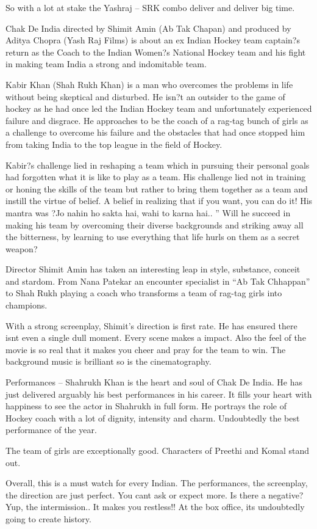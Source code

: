 \documentclass[11pt]{article}
\begin{document}
So with a lot at stake the Yashraj – SRK combo deliver and deliver big time.

Chak De India directed by Shimit Amin (Ab Tak Chapan) and produced by Aditya Chopra (Yash Raj Films) is about an ex Indian Hockey team captain?s return as the Coach to the Indian Women?s National Hockey team and his fight in making team India a strong and indomitable team.

Kabir Khan (Shah Rukh Khan) is a man who overcomes the problems in life without being skeptical and disturbed. He isn?t an outsider to the game of hockey as he had once led the Indian Hockey team and unfortunately experienced failure and disgrace. He approaches to be the coach of a rag-tag bunch of girls as a challenge to overcome his failure and the obstacles that had once stopped him from taking India to the top league in the field of Hockey.



Kabir?s challenge lied in reshaping a team which in pursuing their personal goals had forgotten what it is like to play as a team. His challenge lied not in training or honing the skills of the team but rather to bring them together as a team and instill the virtue of belief. A belief in realizing that if you want, you can do it! His mantra was ?Jo nahin ho sakta hai, wahi to karna hai.. ” Will he succeed in making his team by overcoming their diverse backgrounds and striking away all the bitterness, by learning to use everything that life hurls on them as a secret weapon?

Director Shimit Amin has taken an interesting leap in style, substance, conceit and stardom. From Nana Patekar an encounter specialist in “Ab Tak Chhappan” to Shah Rukh playing a coach who transforms a team of rag-tag girls into champions.

With a strong screenplay, Shimit’s direction is first rate. He has ensured there isnt even a single dull moment. Every scene makes a impact. Also the feel of the movie is so real that it makes you cheer and pray for the team to win. The background music is brilliant so is the cinematography.

Performances – Shahrukh Khan is the heart and soul of Chak De India. He has just delivered arguably his best performances in his career. It fills your heart with happiness to see the actor in Shahrukh in full form. He portrays the role of Hockey coach with a lot of dignity, intensity and charm. Undoubtedly the best performance of the year.

The team of girls are exceptionally good. Characters of Preethi and Komal stand out.

Overall, this is a must watch for every Indian. The performances, the screenplay, the direction are just perfect. You cant ask or expect more. Is there a negative? Yup, the intermission.. It makes you restless!! At the box office, its undoubtedly going to create history.
\end{document}
